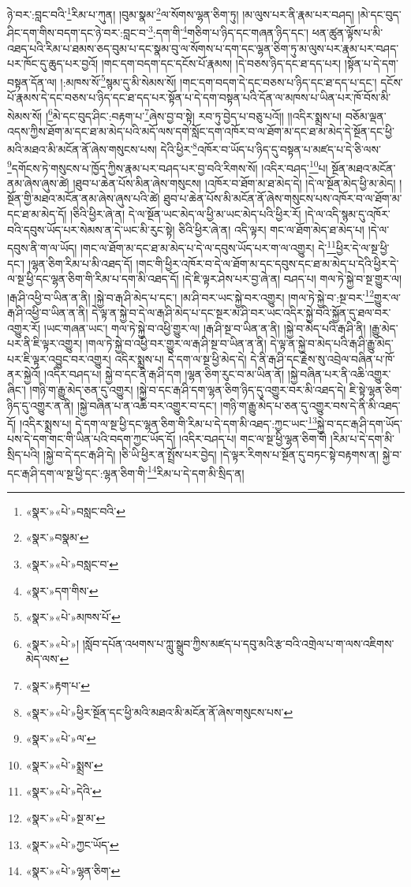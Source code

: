 ཉེ་བར་:བླང་བའི་\footnote{«སྣར་»«པེ་»བསླང་བའི་}རིམ་པ་ཀུན། །བུམ་སྣམ་\footnote{«སྣར་»བསྣམ་}ལ་སོགས་ལྷན་ཅིག་ཏུ། །མ་ལུས་པར་ནི་རྣམ་པར་བཤད། །མེ་དང་བུད་ཤིང་དག་གིས་བདག་དང་ཉེ་བར་:བླང་བ་\footnote{«སྣར་»«པེ་»བསླང་བ་}:དག་གི་\footnote{«སྣར་»དག་གིས་}གཅིག་པ་ཉིད་དང་གཞན་ཉིད་དང་། ཕན་ཚུན་ལྟོས་པ་མི་འཐད་པའི་རིམ་པ་ཐམས་ཅད་བུམ་པ་དང་སྣམ་བུ་ལ་སོགས་པ་དག་དང་ལྷན་ཅིག་ཏུ་མ་ལུས་པར་རྣམ་པར་བཤད་པར་ཁོང་དུ་ཆུད་པར་བྱའོ། །གང་དག་བདག་དང་དངོས་པོ་རྣམས། །དེ་བཅས་ཉིད་དང་ཐ་དད་པར། །སྟོན་པ་དེ་དག་བསྟན་དོན་ལ། །:མཁས་སོ་\footnote{«སྣར་»«པེ་»མཁས་པོ་}སྙམ་དུ་མི་སེམས་སོ། །གང་དག་བདག་དེ་དང་བཅས་པ་ཉིད་དང་ཐ་དད་པ་དང་། དངོས་པོ་རྣམས་དེ་དང་བཅས་པ་ཉིད་དང་ཐ་དད་པར་སྟོན་པ་དེ་དག་བསྟན་པའི་དོན་ལ་མཁས་པ་ཡིན་པར་ཁོ་བོས་མི་སེམས་སོ། །\footnote{«སྣར་»«པེ་»། །སློབ་དཔོན་འཕགས་པ་ཀླུ་སྒྲུབ་ཀྱིས་མཛད་པ་དབུ་མའི་རྩ་བའི་འགྲེལ་པ་ག་ལས་འཇིགས་མེད་ལས་}མེ་དང་བུད་ཤིང་:བརྟག་པ་\footnote{«སྣར་»རྟག་པ་}ཞེས་བྱ་བ་སྟེ། རབ་ཏུ་བྱེད་པ་བཅུ་པའོ།། །།འདིར་སྨྲས་པ། བཅོམ་ལྡན་འདས་ཀྱིས་ཐོག་མ་དང་ཐ་མ་མེད་པའི་མདོ་ལས་དགེ་སློང་དག་འཁོར་བ་ལ་ཐོག་མ་དང་ཐ་མ་མེད་དེ་སྔོན་དང་ཕྱི་མའི་མཐའ་མི་མངོན་ནོ་ཞེས་གསུངས་པས། དེའི་ཕྱིར་\footnote{«སྣར་»«པེ་»ཕྱིར་སྔོན་དང་ཕྱི་མའི་མཐའ་མི་མངོན་ནོ་ཞེས་གསུངས་པས་}འཁོར་བ་ཡོད་པ་ཉིད་དུ་བསྟན་པ་མཛད་པ་དེ་ཅི་ལས་\footnote{«སྣར་»«པེ་»ལ་}དགོངས་ཏེ་གསུངས་པ་ཁྱོད་ཀྱིས་རྣམ་པར་བཤད་པར་བྱ་བའི་རིགས་སོ། །འདིར་བཤད་\footnote{«སྣར་»«པེ་»སྨྲས་}པ། སྔོན་མཐའ་མངོན་ནམ་ཞེས་ཞུས་ཚེ། །ཐུབ་པ་ཆེན་པོས་མིན་ཞེས་གསུངས། །འཁོར་བ་ཐོག་མ་ཐ་མེད་དེ། །དེ་ལ་སྔོན་མེད་ཕྱི་མ་མེད། །སྔོན་གྱི་མཐའ་མངོན་ནམ་ཞེས་ཞུས་པའི་ཚེ། ཐུབ་པ་ཆེན་པོས་མི་མངོན་ནོ་ཞེས་གསུངས་པས་འཁོར་བ་ལ་ཐོག་མ་དང་ཐ་མ་མེད་དོ། །ཅིའི་ཕྱིར་ཞེ་ན། དེ་ལ་སྔོན་ཡང་མེད་ལ་ཕྱི་མ་ཡང་མེད་པའི་ཕྱིར་རོ། །དེ་ལ་འདི་སྙམ་དུ་འཁོར་བའི་དབུས་ཡོད་པར་སེམས་ན་དེ་ཡང་མི་རུང་སྟེ། ཅིའི་ཕྱིར་ཞེ་ན། འདི་ལྟར། གང་ལ་ཐོག་མེད་ཐ་མེད་པ། །དེ་ལ་དབུས་ནི་ག་ལ་ཡོད། །གང་ལ་ཐོག་མ་དང་ཐ་མ་མེད་པ་དེ་ལ་དབུས་ཡོད་པར་ག་ལ་འགྱུར། དེ་\footnote{«སྣར་»«པེ་»དེའི་}ཕྱིར་དེ་ལ་སྔ་ཕྱི་དང་། །ལྷན་ཅིག་རིམ་པ་མི་འཐད་དོ། །གང་གི་ཕྱིར་འཁོར་བ་དེ་ལ་ཐོག་མ་དང་དབུས་དང་ཐ་མ་མེད་པ་དེའི་ཕྱིར་དེ་ལ་སྔ་ཕྱི་དང་ལྷན་ཅིག་གི་རིམ་པ་དག་མི་འཐད་དོ། །དེ་ཇི་ལྟར་ཤེས་པར་བྱ་ཞེ་ན། བཤད་པ། གལ་ཏེ་སྐྱེ་བ་སྔ་གྱུར་ལ། །རྒ་ཤི་འཕྱི་བ་ཡིན་ན་ནི། །སྐྱེ་བ་རྒ་ཤི་མེད་པ་དང་། །མ་ཤི་བར་ཡང་སྐྱེ་བར་འགྱུར། །གལ་ཏེ་སྐྱེ་བ་:སྔ་བར་\footnote{«སྣར་»«པེ་»སྔ་མ་}གྱུར་ལ་རྒ་ཤི་འཕྱི་བ་ཡིན་ན་ནི། དེ་ལྟ་ན་སྐྱེ་བ་དེ་ལ་རྒ་ཤི་མེད་པ་དང་སྔར་མ་ཤི་བར་ཡང་འདིར་སྐྱེ་བའི་སྐྱོན་དུ་ཐལ་བར་འགྱུར་རོ། །ཡང་གཞན་ཡང་། གལ་ཏེ་སྐྱེ་བ་འཕྱི་གྱུར་ལ། །རྒ་ཤི་སྔ་བ་ཡིན་ན་ནི། །སྐྱེ་བ་མེད་པའི་རྒ་ཤི་ནི། །རྒྱུ་མེད་པར་ནི་ཇི་ལྟར་འགྱུར། །གལ་ཏེ་སྐྱེ་བ་འཕྱི་བར་གྱུར་ལ་རྒ་ཤི་སྔ་བ་ཡིན་ན་ནི། དེ་ལྟ་ན་སྐྱེ་བ་མེད་པའི་རྒ་ཤི་རྒྱུ་མེད་པར་ཇི་ལྟར་འབྱུང་བར་འགྱུར། འདིར་སྨྲས་པ། དེ་དག་ལ་སྔ་ཕྱི་མེད་དེ། དེ་ནི་རྒ་ཤི་དང་རྗེས་སུ་འབྲེལ་བཞིན་པ་ཁོ་ནར་སྐྱེའོ། །འདིར་བཤད་པ། སྐྱེ་བ་དང་ནི་རྒ་ཤི་དག །ལྷན་ཅིག་རུང་བ་མ་ཡིན་ནོ། །སྐྱེ་བཞིན་པར་ནི་འཆི་འགྱུར་ཞིང་། །གཉི་ག་རྒྱུ་མེད་ཅན་དུ་འགྱུར། །སྐྱེ་བ་དང་རྒ་ཤི་དག་ལྷན་ཅིག་ཉིད་དུ་འགྱུར་བར་མི་འཐད་དེ། ཇི་སྟེ་ལྷན་ཅིག་ཉིད་དུ་འགྱུར་ན་ནི། །སྐྱེ་བཞིན་པ་ན་འཆི་བར་འགྱུར་བ་དང་། །གཉི་ག་རྒྱུ་མེད་པ་ཅན་དུ་འགྱུར་བས་དེ་ནི་མི་འཐད་དོ། །འདིར་སྨྲས་པ། དེ་དག་ལ་སྔ་ཕྱི་དང་ལྷན་ཅིག་གི་རིམ་པ་དེ་དག་མི་འཐད་:ཀྱང་ཡང་\footnote{«སྣར་»«པེ་»ཀྱང་ཡོད་}སྐྱེ་བ་དང་རྒ་ཤི་དག་ཡོད་པས་དེ་དག་གང་གི་ཡིན་པའི་བདག་ཀྱང་ཡོད་དོ། །འདིར་བཤད་པ། གང་ལ་སྔ་ཕྱི་ལྷན་ཅིག་གི །རིམ་པ་དེ་དག་མི་སྲིད་པའི། །སྐྱེ་བ་དེ་དང་རྒ་ཤི་དེ། །ཅི་ཡི་ཕྱིར་ན་སྤྲོས་པར་བྱེད། །དེ་ལྟར་རིགས་པ་སྔོན་དུ་བཏང་སྟེ་བརྟགས་ན། སྐྱེ་བ་དང་རྒ་ཤི་དག་ལ་སྔ་ཕྱི་དང་:ལྷན་ཅིག་གི་\footnote{«སྣར་»«པེ་»ལྷན་ཅིག་}རིམ་པ་དེ་དག་མི་སྲིད་ན། 